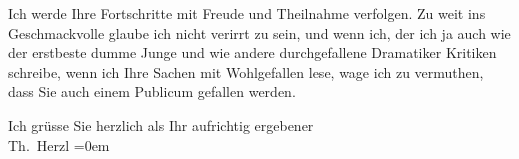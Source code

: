 \pstart
           Ich werde Ihre Fortschritte mit Freude und Theilnahme verfolgen. Zu weit ins
               Geschmackvolle glaube ich nicht verirrt zu sein, und wenn ich, der ich ja auch wie
               der erstbeste dumme Junge und wie andere durchgefallene Dramatiker Kritiken schreibe,
               wenn ich Ihre Sachen mit Wohlgefallen lese, wage ich zu vermuthen, dass Sie auch
               einem Publicum gefallen werden.\pend
           
\pstart
           Ich grüsse Sie herzlich als Ihr aufrichtig ergebener{\\[\baselineskip]}\spacefill\mbox{Th. Herzl}\pend
           \leftskip=0em{}\endnumbering{}  \newcommand{\dateiname}{L03823}\newcommand{\titel}{Theodor Herzl an Arthur Schnitzler, 29. 7. 1892}\newcommand{\editorInnen}{Selma Jahnke und Martin Anton Müller}
